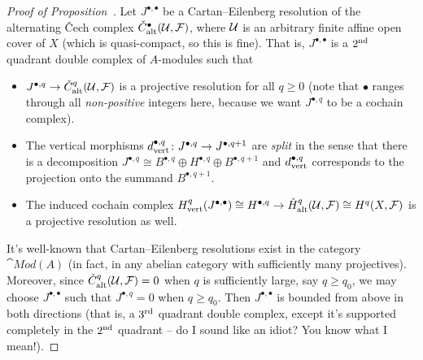 \documentclass[a4paper,parskip=half,numbers=enddot, DIV=12]{scrreprt}
\renewcommand{\geq}{\geqslant}
\begin{document}
\begin{proof}[Proof of Proposition~]
	Let $J^{\bullet,\bullet}$ be a Cartan--Eilenberg resolution of the alternating \v Cech complex $\check{C}_{\mathrm{alt}}^\bullet(\mathcal{U},\mathcal{F})$, where $\mathcal{U}$ is an arbitrary finite affine open cover of $X$ (which is quasi-compact, so this is fine). That is, $J^{\bullet,\bullet}$ is a $2^{\text{nd}}$ quadrant double complex of $A$-modules such that
	\begin{itemize}
		\item $J^{\bullet,q}\morphism\check{C}_\alt^q(\Uu,\Ff)$ is a projective resolution for all $q\geq 0$ (note that $\bullet$ ranges through all \emph{non-positive} integers here, because we want $J^{\bullet,q}$ to be a cochain complex).
		\item The vertical morphisms $d_\ver^{\bullet,q}\colon J^{\bullet,q}\morphism J^{\bullet,q+1}$ are \emph{split} in the sense that there is a decomposition $J^{\bullet,q}\cong B^{\bullet,q}\oplus H^{\bullet,q}\oplus B^{\bullet,q+1}$ and $d_{\mathrm{vert}}^{\bullet,q}$ corresponds to the projection onto the summand $B^{\bullet,q+1}$.
		\item The induced cochain complex $H_\ver^q(J^{\bullet,\bullet})\cong H^{\bullet,q}\morphism \check{H}_\alt^q(\Uu,\Ff)\cong H^q(X,\Ff)$ is a projective resolution as well.
	\end{itemize}
It's well-known that Cartan--Eilenberg resolutions exist in the category $\cat{Mod}(A)$ (in fact, in any abelian category with sufficiently many projectives). Moreover, since $\check{C}^q_{\mathrm{alt}}(\mathcal{U},\mathcal{F})=0$ when $q$ is sufficiently large, say $q\geq q_0$, we may choose $J ^{\bullet,\bullet}$ such that $J^{\bullet,q}=0$ when $q\geq q_0$. Then $J^{\bullet,\bullet}$ is bounded from above in both directions (that is, a $3^{\text{rd}}$ quadrant double complex, except it's supported completely in the $2^{\text{nd}}$ quadrant -- do I sound like an idiot? You know what I mean!).


\end{proof}
\end{document}
